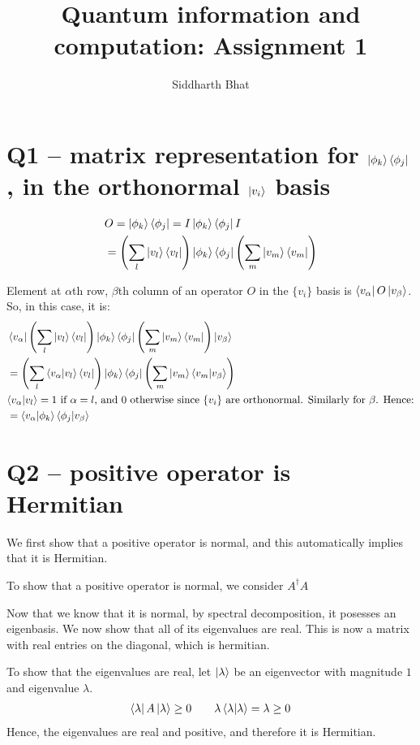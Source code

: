 \documentclass[11pt]{book}
\title{Quantum information and computation: Assignment 1}
\author{Siddharth Bhat}
\date{}
\begin{document}
\section{Q1 -- matrix representation for $\ket{\phi_k}\bra{\phi_j}$, in the
orthonormal $\ket{v_i}$ basis}

\begin{align*}
    &O = \ket{\phi_k}\bra{\phi_j} = I \ket{\phi_k}\bra{\phi_j} I\\
    &= \left(\sum_l \ket{v_l}\bra{v_l}\right) \ket{\phi_k}\bra{\phi_j} \left(\sum_m \ket{v_m}\bra{v_m}\right)
\end{align*}

Element at $\alpha$th row, $\beta$th column of an operator $O$ in the $\{v_i\}$ basis
is $\bra{v_\alpha}O\ket{v_\beta}$. So, in this case, it is:
\begin{align*}
    &\bra{v_\alpha} \left(\sum_l \ket{v_l}\bra{v_l}\right) \ket{\phi_k}\bra{\phi_j} \left(\sum_m \ket{v_m}\bra{v_m}\right) \ket{v_\beta} \\
    &= \left(\sum_l \bra{v_\alpha}\ket{v_l}\bra{v_l}\right) \ket{\phi_k}\bra{\phi_j} \left(\sum_m \ket{v_m}\bra{v_m}\ket{v_\beta} \right)  \\
    &\text{$\bra{v_\alpha}\ket{v_l} = 1$ if $\alpha = l$, and $0$ otherwise since $\{v_i\}$ are orthonormal. Similarly for $\beta$. Hence:} \\
    &= \bra{v_\alpha}\ket{\phi_k}\bra{\phi_j}\ket{v_\beta}
\end{align*}

\section{Q2 -- positive operator is Hermitian}
We first show that a positive operator is normal, and this automatically
implies that it is Hermitian.

To show that a positive operator is normal, we consider $A^\dagger A$

Now that we know that it is normal, by spectral decomposition, it
posesses an eigenbasis. We now show that all of its eigenvalues are real.
This is now a matrix with real entries on the diagonal, which is hermitian.

To show that the eigenvalues are real, let $\ket \lambda$ be an eigenvector
with magnitude $1$ and eigenvalue $\lambda$.
\begin{align*}
    \bra \lambda A \ket \lambda \geq 0 \qquad
    \lambda \braket{\lambda} = \lambda \geq 0
\end{align*}
Hence, the eigenvalues are real and positive, and therefore it is Hermitian.
\end{document}
